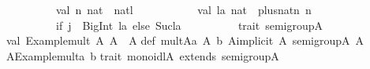 \begin{isabellebody}
\begin{isamarkuptext}
\ \ \ \ \ \ \ \ \ \ \ val\ n{}\ nat\ {}\ nat{}l{}\isanewline
\ \ \ \ \ \ \ \ \ \ \ val\ la{}\ nat\ {}\ plus{}nat{}n{}\ n{}{}\isanewline
\ \ \ \ \ \ \ \ \ \ \ {}if\ {}j\ {}{}\ BigInt{}{}{}{}\ la\ else\ Suc{}la{}{}\isanewline
\ \ \ \ \ \ \ \ \ {}{}\isanewline
\isanewline
trait\ semigroup{}A{}\ {}\isanewline
\ \ val\ {}Example{}mult{}{}\ {}A{}\ A{}\ {}{}\ A\isanewline
{}\isanewline
def\ mult{}A{}{}a{}\ A{}\ b{}\ A{}{}implicit\ A{}\ semigroup{}A{}{}{}\ A\ {}\isanewline
\ \ A{}{}Example{}mult{}{}a{}\ b{}\isanewline
\isanewline
trait\ monoidl{}A{}\ extends\ semigroup{}A{}\ {}\isanewline

\end{isamarkuptext}
\end{isabellebody}
